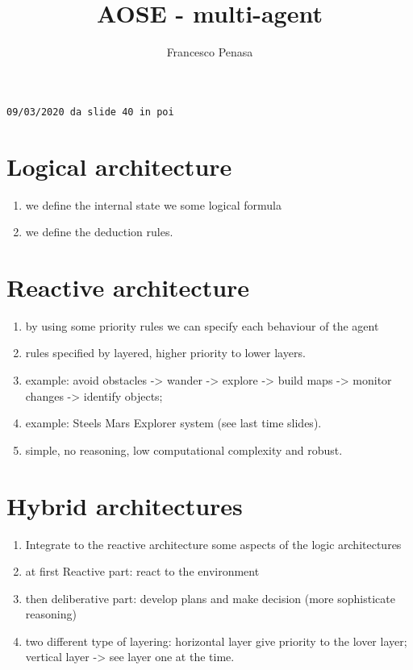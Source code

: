 \documentclass[11pt]{article}
\begin{document}
\author{Francesco Penasa}
\title{AOSE - multi-agent}
\maketitle

\medskip

\texttt{09/03/2020 da slide 40 in poi }
\section{Logical architecture} %
\label{sec:logical}
\begin{enumerate}
	\item we define the internal state we some logical formula
	\item we define the deduction rules.
\end{enumerate}

\section{Reactive architecture} %
\label{sec:reactive_architecture}
\begin{enumerate}
	\item by using some priority rules we can specify each behaviour of the agent
	\item rules specified by layered, higher priority to lower layers.
	\item example: avoid obstacles -> wander -> explore -> build maps -> monitor changes -> identify objects; 
	\item example: Steels Mars Explorer system (see last time slides).
	\item simple, no reasoning, low computational complexity and robust.
\end{enumerate}

\section{Hybrid architectures} %
\label{sec:hybrid_architectures}
\begin{enumerate}
	\item Integrate to the reactive architecture some aspects of the logic architectures
	\item at first Reactive part: react to the environment
	\item then deliberative part: develop plans and make decision (more sophisticate reasoning)
	\item two different type of layering: horizontal layer give priority to the lover layer; vertical layer -> see layer one at the time. 
\end{enumerate}
\end{document}
